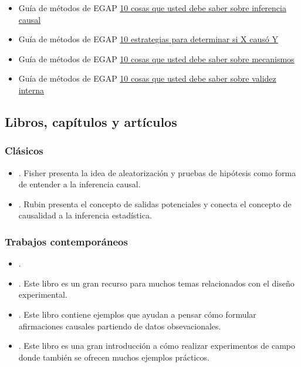 \documentclass[
  12pt,
  spanish,
]{book}
\begin{document}
\begin{itemize}
\item
  Guía de métodos de EGAP \href{https://egap.org/resource/10-things-to-know-about-causal-inference/}{10 cosas que usted debe saber sobre inferencia causal}
\item
  Guía de métodos de EGAP \href{https://egap.org/resource/10-strategies-figuring-out-if-x-caused-y/}{10 estrategias para determinar si X causó Y}
\item
  Guía de métodos de EGAP \href{https://egap.org/resource/10-things-mechanisms/}{10 cosas que usted debe saber sobre mecanismos}
\item
  Guía de métodos de EGAP \href{https://egap.org/resource/10-things-to-know-about-external-validity/}{10 cosas que usted debe saber sobre validez interna}
\end{itemize}

\hypertarget{causalinference-cites}{%
\subsection{Libros, capítulos y artículos}\label{causalinference-cites}}

\hypertarget{causalinference-classics}{%
\subsubsection{Clásicos}\label{causalinference-classics}}

\begin{itemize}
\item
  \autocite{fisher_design_1935}. Fisher presenta la idea de aleatorización y pruebas de hipótesis como forma de entender a la inferencia causal.
\item
  \autocite{rubin:1974}. Rubin presenta el concepto de salidas potenciales y conecta el concepto de causalidad a la inferencia estadística.
\end{itemize}

\hypertarget{trabajos-contemporuxe1neos}{%
\subsubsection{Trabajos contemporáneos}\label{trabajos-contemporuxe1neos}}

\begin{itemize}
\item
  \autocite{brady2008causation}.
\item
  \autocite[Capítulo 1]{gerber_field_2012}. Este libro es un gran recurso para muchos temas relacionados con el diseño experimental.
\item
  \autocite[Capítulo 1]{morgan_counterfactuals_2007}. Este libro contiene ejemplos que ayudan a pensar cómo formular afirmaciones causales partiendo de datos obsevacionales.
\item
  \autocite{glennerster_running_2013}. Este libro es una gran introducción a cómo realizar experimentos de campo donde también se ofrecen muchos ejemplos prácticos.
\end{itemize}
\end{document}

